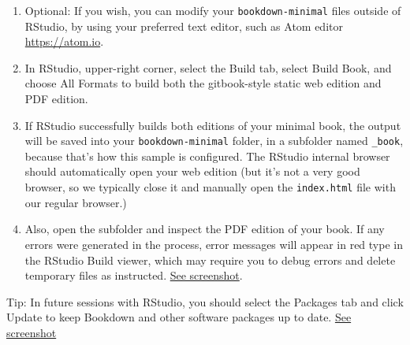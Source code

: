 \documentclass[
  english,
]{book}
\begin{document}
\begin{enumerate}
\item
  Optional: If you wish, you can modify your \texttt{bookdown-minimal} files outside of RStudio, by using your preferred text editor, such as Atom editor \url{https://atom.io}.
\item
  In RStudio, upper-right corner, select the Build tab, select Build Book, and choose All Formats to build both the gitbook-style static web edition and PDF edition.
\item
  If RStudio successfully builds both editions of your minimal book, the output will be saved into your \texttt{bookdown-minimal} folder, in a subfolder named \texttt{\_book}, because that's how this sample is configured. The RStudio internal browser should automatically open your web edition (but it's not a very good browser, so we typically close it and manually open the \texttt{index.html} file with our regular browser.)
\item
  Also, open the subfolder and inspect the PDF edition of your book. If any errors were generated in the process, error messages will appear in red type in the RStudio Build viewer, which may require you to debug errors and delete temporary files as instructed. \href{images/20-bookdown/build-successful.png}{See screenshot}.
\end{enumerate}

Tip: In future sessions with RStudio, you should select the Packages tab and click Update to keep Bookdown and other software packages up to date. \href{images/20-bookdown/update-packages.png}{See screenshot}
\end{document}
